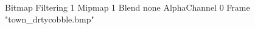 {Bitmap
	{Filtering 1}
	{Mipmap 1}
	{Blend none}
	{AlphaChannel 0}
	{Frame "town_drtycobble.bmp"}
}
